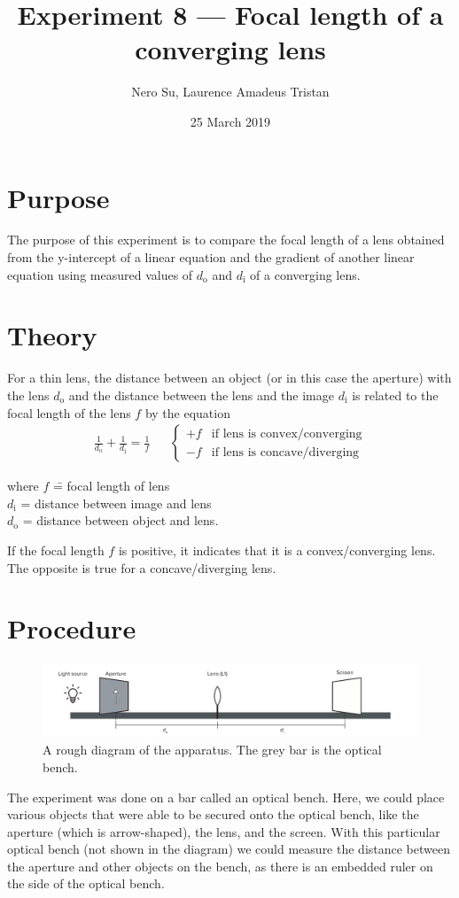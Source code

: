 \documentclass[letter,12pt]{article}
\title{Experiment 8 --- Focal length of a converging lens}
\author{Nero Su, Laurence Amadeus Tristan}
\date{25 March 2019}
\numberwithin{equation}{section}
\numberwithin{figure}{section}
\numberwithin{table}{section}
\newcommand{\dist}[1] {\(d_{\mathrm{#1}}\)}
\newcommand{\mdist}[1] {d_{\mathrm{#1}}}
\begin{document}
\maketitle
\section{Purpose}
The purpose of this experiment is to compare the focal length of a lens obtained from the y-intercept of a linear equation and the gradient of another linear equation using measured values of \(d_{\mathrm{o}}\) and \(d_{\mathrm{i}}\) of a converging lens.

\section{Theory}
For a thin lens, the distance between an object (or in this case the aperture) with the lens \dist{o} and the distance between the lens and the image \dist{i} is related to the focal length of the lens \(f\) by the equation
\begin{align} \label{eq:t1}
  \frac{1}{\mdist{o}} + \frac{1}{\mdist{i}} = \frac{1}{f} && \begin{cases}
    +f& \text{if lens is convex/converging} \\
    -f& \text{if lens is concave/diverging}
  \end{cases}
\end{align}

\begin{tabbing}
  where \= \(f\) \= = focal length of lens \\
  \> \dist{i} \> = distance between image and lens \\
  \> \dist{o} \> = distance between object and lens.
\end{tabbing}

If the focal length \(f\) is positive, it indicates that it is a convex/converging lens. The opposite is true for a concave/diverging lens.

\newpage
\section{Procedure}
\begin{figure}[!ht]
  \centering
  \includegraphics[width=\textwidth]{apparatus.pdf}
  \caption{A rough diagram of the apparatus. The grey bar is the optical bench.}
  \label{fig:p1}
\end{figure}
The experiment was done on a bar called an optical bench. Here, we could place various objects that were able to be secured onto the optical bench, like the aperture (which is arrow-shaped), the lens, and the screen. With this particular optical bench (not shown in the diagram) we could measure the distance between the aperture and other objects on the bench, as there is an embedded ruler on the side of the optical bench.
\end{document}
